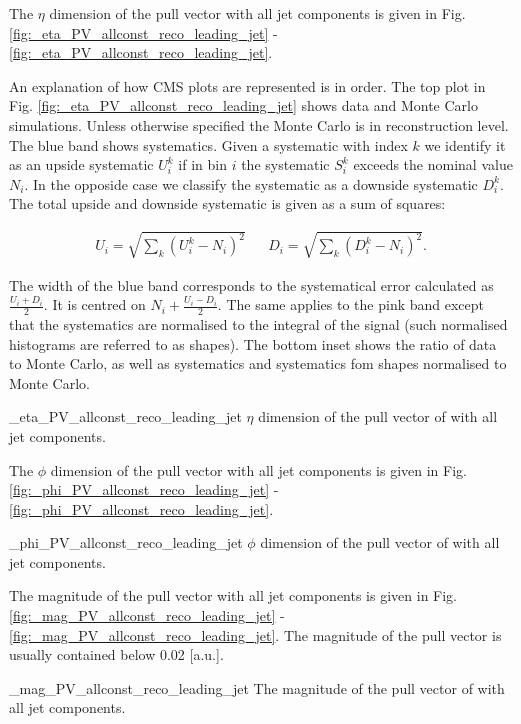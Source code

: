 The $\eta$ dimension of the pull vector with all jet components is given in Fig. \ref{fig:_eta_PV_allconst_reco_leading_jet} - \ref{fig:_eta_PV_allconst_reco_leading_jet}.

An explanation of how CMS plots are represented is in order. The top plot in Fig. \ref{fig:_eta_PV_allconst_reco_leading_jet} shows data and Monte Carlo simulations. Unless otherwise specified the Monte Carlo is in reconstruction level. The blue band shows systematics. Given a systematic with index $k$ we identify it as an upside systematic $U^{k}_{i}$ if in bin $i$ the systematic $S^{k}_i$ exceeds the nominal value $N_{i}$. In the opposide case we classify the systematic as a downside systematic $D^{k}_{i}$. The total upside and downside systematic is given as a sum of squares:

\begin{align}
U_{i}=\sqrt{\sum_{k}\left(U^{k}_{i}-N_{i}\right)^{2}} && D_{i}=\sqrt{\sum_{k}\left(D^{k}_{i}-N_{i}\right)^{2}}.
\end{align}

The width of the blue band corresponds to the systematical error calculated as $\frac{U_{i}+D_{i}}{2}$. It is centred on $N_{i} + \frac{U_{i}-D_{i}}{2}$. The same applies to the pink band except that the systematics are normalised to the integral of the signal (such normalised histograms are referred to as shapes). The bottom inset shows the ratio of data to Monte Carlo, as well as systematics and systematics fom shapes normalised to Monte Carlo.

          {_eta_PV_allconst_reco_leading_jet}
          {$\eta$ dimension of the pull vector of \leadingjet with all jet components.}

The $\phi$ dimension of the pull vector with all jet components is given in Fig. \ref{fig:_phi_PV_allconst_reco_leading_jet} - \ref{fig:_phi_PV_allconst_reco_leading_jet}. 

          {_phi_PV_allconst_reco_leading_jet}
          {$\phi$ dimension of the pull vector of \leadingjet with all jet components.}

The magnitude of the pull vector with all jet components is given in Fig. \ref{fig:_mag_PV_allconst_reco_leading_jet} - \ref{fig:_mag_PV_allconst_reco_leading_jet}. The magnitude of the pull vector is usually contained below 0.02 [a.u.].

          {_mag_PV_allconst_reco_leading_jet}
          {The magnitude of the pull vector of \leadingjet with all jet components.}


